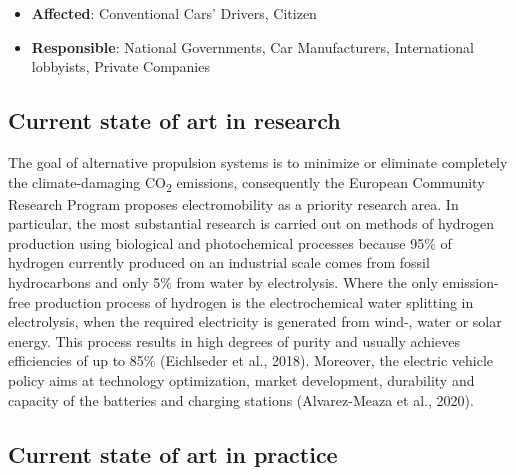 \documentclass[
]{book}
\providecommand{\tightlist}{%
  \setlength{\itemsep}{0pt}\setlength{\parskip}{0pt}}
\begin{document}
\begin{itemize}
\tightlist
\item
  \textbf{Affected}: Conventional Cars' Drivers, Citizen
\item
  \textbf{Responsible}: National Governments, Car Manufacturers, International lobbyists, Private Companies
\end{itemize}

\hypertarget{current-state-of-art-in-research-13}{%
\subsection*{Current state of art in research}\label{current-state-of-art-in-research-13}}

The goal of alternative propulsion systems is to minimize or eliminate completely the climate-damaging CO\textsubscript{2} emissions, consequently the European Community Research Program proposes electromobility as a priority research area. In particular, the most substantial research is carried out on methods of hydrogen production using biological and photochemical processes because 95\% of hydrogen currently produced on an industrial scale comes from fossil hydrocarbons and only 5\% from water by electrolysis. Where the only emission-free production process of hydrogen is the electrochemical water splitting in electrolysis, when the required electricity is generated from wind-, water or solar energy. This process results in high degrees of purity and usually achieves efficiencies of up to 85\% (Eichlseder et al., 2018). Moreover, the electric vehicle policy aims at technology optimization, market development, durability and capacity of the batteries and charging stations (Alvarez-Meaza et al., 2020).

\hypertarget{current-state-of-art-in-practice-12}{%
\subsection*{Current state of art in practice}\label{current-state-of-art-in-practice-12}}
\end{document}
